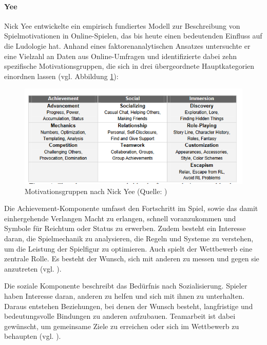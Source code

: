 \paragraph{Yee}
Nick Yee entwickelte ein empirisch fundiertes Modell zur Beschreibung von Spielmotivationen in Online-Spielen, das bis heute einen bedeutenden Einfluss auf die Ludologie hat. Anhand eines faktorenanalytischen Ansatzes untersuchte er eine Vielzahl an Daten aus Online-Umfragen und identifizierte dabei zehn spezifische Motivationsgruppen, die sich in drei übergeordnete Hauptkategorien einordnen lassen (vgl. Abbildung \ref{fig:nick_yee_motivations}):

\begin{figure}[ht]
\centering
\includegraphics[width=1\linewidth]{content/pictures/nick_yee_categorizations.PNG}
\caption{Motivationsgruppen nach Nick Yee (Quelle: \citealp[S. 5]{yee_motivations_2006})}
\label{fig:nick_yee_motivations}
\end{figure}

Die Achievement-Komponente umfasst den Fortschritt im Spiel, sowie das damit einhergehende Verlangen Macht zu erlangen, schnell voranzukommen und Symbole für Reichtum oder Status zu erwerben. Zudem besteht ein Interesse daran, die Spielmechanik zu analysieren, die Regeln und Systeme zu verstehen, um die Leistung der Spielfigur zu optimieren. Auch spielt der Wettbewerb eine zentrale Rolle. Es besteht der Wunsch, sich mit anderen zu messen und gegen sie anzutreten (vgl. \citealp[S. 5]{yee_motivations_2006}).

Die soziale Komponente beschreibt das Bedürfnis nach Sozialisierung. Spieler haben Interesse daran, anderen zu helfen und sich mit ihnen zu unterhalten. Daraus entstehen Beziehungen, bei denen der Wunsch besteht, langfristige und bedeutungsvolle Bindungen zu anderen aufzubauen. Teamarbeit ist dabei gewünscht, um gemeinsame Ziele zu erreichen oder sich im Wettbewerb zu behaupten (vgl. \citealp[S. 6]{yee_motivations_2006}).

